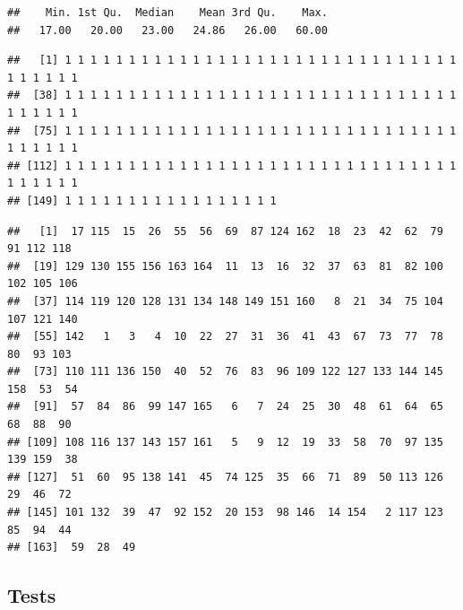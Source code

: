 \documentclass[
]{article}
\newenvironment{Shaded}{\begin{snugshade}}{\end{snugshade}}
\newcommand{\AttributeTok}[1]{\textcolor[rgb]{0.77,0.63,0.00}{#1}}
\newcommand{\ConstantTok}[1]{\textcolor[rgb]{0.00,0.00,0.00}{#1}}
\newcommand{\FunctionTok}[1]{\textcolor[rgb]{0.00,0.00,0.00}{#1}}
\newcommand{\NormalTok}[1]{#1}
\newcommand{\SpecialCharTok}[1]{\textcolor[rgb]{0.00,0.00,0.00}{#1}}
\begin{document}
\begin{verbatim}
##    Min. 1st Qu.  Median    Mean 3rd Qu.    Max. 
##   17.00   20.00   23.00   24.86   26.00   60.00
\end{verbatim}

\begin{Shaded}
\end{Shaded}

\begin{verbatim}
##   [1] 1 1 1 1 1 1 1 1 1 1 1 1 1 1 1 1 1 1 1 1 1 1 1 1 1 1 1 1 1 1 1 1 1 1 1 1 1
##  [38] 1 1 1 1 1 1 1 1 1 1 1 1 1 1 1 1 1 1 1 1 1 1 1 1 1 1 1 1 1 1 1 1 1 1 1 1 1
##  [75] 1 1 1 1 1 1 1 1 1 1 1 1 1 1 1 1 1 1 1 1 1 1 1 1 1 1 1 1 1 1 1 1 1 1 1 1 1
## [112] 1 1 1 1 1 1 1 1 1 1 1 1 1 1 1 1 1 1 1 1 1 1 1 1 1 1 1 1 1 1 1 1 1 1 1 1 1
## [149] 1 1 1 1 1 1 1 1 1 1 1 1 1 1 1 1 1
\end{verbatim}

\begin{Shaded}
\end{Shaded}

\begin{verbatim}
##   [1]  17 115  15  26  55  56  69  87 124 162  18  23  42  62  79  91 112 118
##  [19] 129 130 155 156 163 164  11  13  16  32  37  63  81  82 100 102 105 106
##  [37] 114 119 120 128 131 134 148 149 151 160   8  21  34  75 104 107 121 140
##  [55] 142   1   3   4  10  22  27  31  36  41  43  67  73  77  78  80  93 103
##  [73] 110 111 136 150  40  52  76  83  96 109 122 127 133 144 145 158  53  54
##  [91]  57  84  86  99 147 165   6   7  24  25  30  48  61  64  65  68  88  90
## [109] 108 116 137 143 157 161   5   9  12  19  33  58  70  97 135 139 159  38
## [127]  51  60  95 138 141  45  74 125  35  66  71  89  50 113 126  29  46  72
## [145] 101 132  39  47  92 152  20 153  98 146  14 154   2 117 123  85  94  44
## [163]  59  28  49
\end{verbatim}

\hypertarget{tests}{%
\subsection{Tests}\label{tests}}
\end{document}

